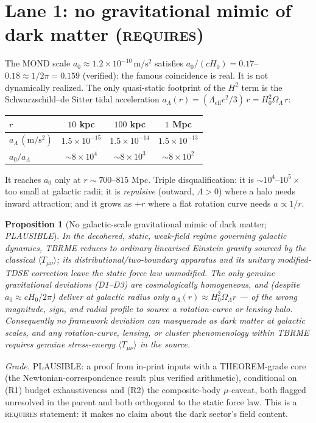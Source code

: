 \documentclass[11pt]{article}
\newtheorem{proposition}{Proposition}
\newcommand{\Tmn}{\langle T_{\mu\nu}\rangle}
\newcommand{\reqs}{{\normalfont\scshape requires}}
\begin{document}
\section{Lane 1: no gravitational mimic of dark matter (\reqs)}\label{sec:prop}
The MOND scale $a_0\approx1.2\times10^{-10}\,\mathrm{m/s^2}$ satisfies
$a_0/(cH_0)=0.17$--$0.18\approx1/2\pi=0.159$ (verified): the famous coincidence
is real. It is not dynamically realized. The only quasi-static footprint of the
$H^2$ term is the Schwarzschild--de Sitter tidal acceleration
$a_\Lambda(r)=(\Lambda_{\mathrm{eff}}c^2/3)\,r=H_0^2\Omega_\Lambda\,r$:
\begin{center}\small
\begin{tabular}{@{}l c c c@{}}
\toprule
$r$ & $10$ kpc & $100$ kpc & $1$ Mpc \\
\midrule
$a_\Lambda\,(\mathrm{m/s^2})$ & $1.5\times10^{-15}$ & $1.5\times10^{-14}$ & $1.5\times10^{-13}$ \\
$a_0/a_\Lambda$ & $\sim8\times10^{4}$ & $\sim8\times10^{3}$ & $\sim8\times10^{2}$ \\
\bottomrule
\end{tabular}
\end{center}
It reaches $a_0$ only at $r\sim700$--$815$ Mpc. Triple disqualification: it is
$\sim10^{4}$--$10^{5}\times$ too small at galactic radii; it is \emph{repulsive}
(outward, $\Lambda>0$) where a halo needs inward attraction; and it grows as
$+r$ where a flat rotation curve needs $a\propto1/r$.

\begin{proposition}[No galactic-scale gravitational mimic of dark matter; \emph{PLAUSIBLE}]
\label{prop:no-mimic}
In the decohered, static, weak-field regime governing galactic dynamics, TBRME
reduces to ordinary linearised Einstein gravity sourced by the classical
$\Tmn$; its distributional/two-boundary apparatus and its unitary modified-TDSE
correction leave the static force law unmodified. The only genuine gravitational
deviations (D1--D3) are cosmologically homogeneous, and (despite $a_0\approx
cH_0/2\pi$) deliver at galactic radius only $a_\Lambda(r)\approx H_0^2
\Omega_\Lambda r$ --- of the wrong magnitude, sign, and radial profile to source
a rotation-curve or lensing halo. Consequently no framework deviation can
masquerade as dark matter at galactic scales, and any rotation-curve, lensing,
or cluster phenomenology within TBRME \emph{requires} genuine stress-energy
$\Tmn$ in the source.
\end{proposition}
\noindent\emph{Grade.} PLAUSIBLE: a proof from in-print inputs with a
THEOREM-grade core (the Newtonian-correspondence result plus verified
arithmetic), conditional on (R1) budget exhaustiveness and (R2) the composite-body
$\mu$-caveat, both flagged unresolved in the parent and both orthogonal to the
static force law. This is a \reqs{} statement: it makes no claim about the dark
sector's field content.
\end{document}
